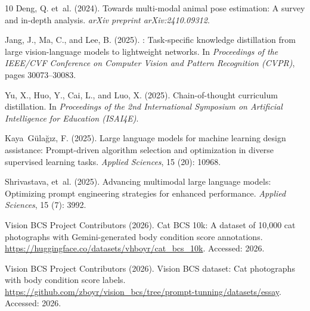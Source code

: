\documentclass[11pt,twocolumn]{article}
\begin{document}
\begin{thebibliography}{10}
Deng, Q. et~al. (2024).
\newblock Towards multi-modal animal pose estimation: A survey and in-depth
  analysis.
\newblock \emph{arXiv preprint arXiv:2410.09312}.

Jang, J., Ma, C., and Lee, B. (2025).
: Task-specific knowledge distillation from large
  vision-language models to lightweight networks.
\newblock In \emph{Proceedings of the IEEE/CVF Conference on Computer Vision
  and Pattern Recognition (CVPR)}, pages 30073--30083.
\newblock {}

Yu, X., Huo, Y., Cai, L., and Luo, X. (2025).
\newblock Chain-of-thought curriculum distillation.
\newblock In \emph{Proceedings of the 2nd International Symposium on
  Artificial Intelligence for Education (ISAI4E)}.
\newblock {}

Kaya~G{\"u}la{\u{g}}{\i}z, F. (2025).
\newblock Large language models for machine learning design assistance:
  Prompt-driven algorithm selection and optimization in diverse supervised
  learning tasks.
\newblock \emph{Applied Sciences}, 15 (20): 10968.
\newblock {}

Shrivastava, et~al. (2025).
\newblock Advancing multimodal large language models: Optimizing prompt
  engineering strategies for enhanced performance.
\newblock \emph{Applied Sciences}, 15 (7): 3992.
\newblock {}

{Vision BCS Project Contributors} (2026).
\newblock Cat {BCS} 10k: A dataset of 10{,}000 cat photographs with {Gemini}-generated body condition score annotations.
\newblock \url{https://huggingface.co/datasets/vhboyr/cat_bcs_10k}.
\newblock Accessed: 2026.

{Vision BCS Project Contributors} (2026).
\newblock Vision {BCS} dataset: Cat photographs with body condition score
  labels.
\newblock \url{https://github.com/zboyr/vision_bcs/tree/prompt-tunning/datasets/essay}.
\newblock Accessed: 2026.

\end{thebibliography}
\end{document}
